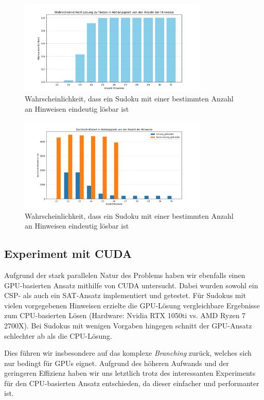\begin{figure}[h!]
    \centering
    \includegraphics[width=0.8\textwidth]{Pictures/wahrscheinlichkeiten}
    \caption{Wahrscheinlichkeit, dass ein Sudoku mit einer bestimmten Anzahl an Hinweisen eindeutig lösbar ist}
    \label{fig:wahrscheinlichkeiten}

\end{figure}

\begin{figure}[h!]
    \centering
    \includegraphics[width=0.8\textwidth]{Pictures/zeiten}
    \caption{Wahrscheinlichkeit, dass ein Sudoku mit einer bestimmten Anzahl an Hinweisen eindeutig lösbar ist}
    \label{fig:zeiten}
\end{figure}

\subsection{Experiment mit CUDA}

Aufgrund der stark parallelen Natur des Problems haben wir ebenfalls einen GPU-basierten Ansatz mithilfe von CUDA untersucht. Dabei wurden sowohl ein CSP- als auch ein SAT-Ansatz implementiert und getestet.
Für Sudokus mit vielen vorgegebenen Hinweisen erzielte die GPU-Lösung vergleichbare Ergebnisse zum CPU-basierten Lösen (Hardware: Nvidia RTX 1050ti vs. AMD Ryzen 7 2700X). Bei Sudokus mit wenigen Vorgaben hingegen schnitt der GPU-Ansatz schlechter ab als die CPU-Lösung.

Dies führen wir insbesondere auf das komplexe \emph{Branching} zurück, welches sich nur bedingt für GPUs eignet. Aufgrund des höheren Aufwands und der geringeren Effizienz haben wir uns letztlich trotz des interessanten Experiments für den CPU-basierten Ansatz entschieden, da dieser einfacher und performanter ist.